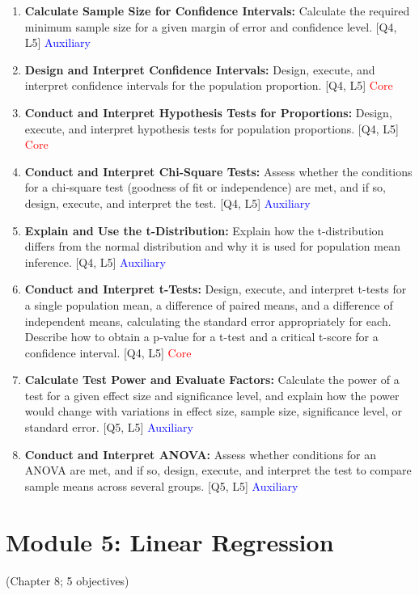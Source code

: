 \documentclass[12pt]{article}
\begin{document}
\begin{enumerate}
    \item \textbf{Calculate Sample Size for Confidence Intervals:} Calculate the required minimum sample size for a given margin of error and confidence level. [Q4, L5] \textcolor{blue}{Auxiliary}
    \item \textbf{Design and Interpret Confidence Intervals:} Design, execute, and interpret confidence intervals for the population proportion. [Q4, L5] \textcolor{red}{Core}
    \item \textbf{Conduct and Interpret Hypothesis Tests for Proportions:} Design, execute, and interpret hypothesis tests for population proportions. [Q4, L5] \textcolor{red}{Core}
    \item \textbf{Conduct and Interpret Chi-Square Tests:} Assess whether the conditions for a chi-square test (goodness of fit or independence) are met, and if so, design, execute, and interpret the test. [Q4, L5] \textcolor{blue}{Auxiliary}
    \item \textbf{Explain and Use the t-Distribution:} Explain how the t-distribution differs from the normal distribution and why it is used for population mean inference. [Q4, L5] \textcolor{blue}{Auxiliary}
    \item \textbf{Conduct and Interpret t-Tests:} Design, execute, and interpret t-tests for a single population mean, a difference of paired means, and a difference of independent means, calculating the standard error appropriately for each. Describe how to obtain a p-value for a t-test and a critical t-score for a confidence interval. [Q4, L5] \textcolor{red}{Core}
    \item \textbf{Calculate Test Power and Evaluate Factors:} Calculate the power of a test for a given effect size and significance level, and explain how the power would change with variations in effect size, sample size, significance level, or standard error. [Q5, L5] \textcolor{blue}{Auxiliary}
    \item \textbf{Conduct and Interpret ANOVA:} Assess whether conditions for an ANOVA are met, and if so, design, execute, and interpret the test to compare sample means across several groups. [Q5, L5] \textcolor{blue}{Auxiliary} 
\end{enumerate}

\newpage


\section{Module 5: Linear Regression}
(Chapter 8; 5 objectives)
\end{document}
